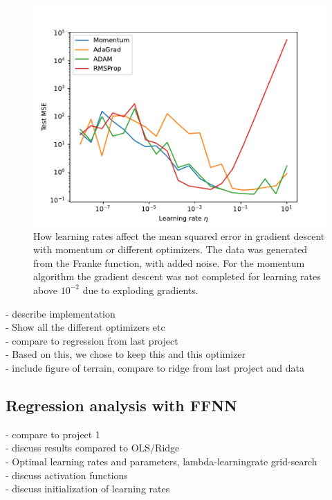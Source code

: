 \begin{figure}
    \centering
    \includegraphics[width=0.99\linewidth]{examples/tests_even/figs/Franke-learningrates-optimizers.pdf}
    \caption{How learning rates affect the mean squared error in gradient descent with momentum or different optimizers. The data was generated from the Franke function, with added noise. For the momentum algorithm the gradient descent was not completed for learning rates above $10^{-2}$ due to exploding gradients.}
    \label{fig:franke-learningrate}
\end{figure}

- describe implementation\\
- Show all the different optimizers etc\\
- compare to regression from last project\\
- Based on this, we chose to keep this and this optimizer\\
- include figure of terrain, compare to ridge from last project and data\\



\subsection{Regression analysis with FFNN}

- compare to project 1\\
- discuss results compared to OLS/Ridge\\
- Optimal learning rates and parameters, lambda-learningrate grid-search\\
- discuss activation functions\\
- discuss initialization of learning rates\\


